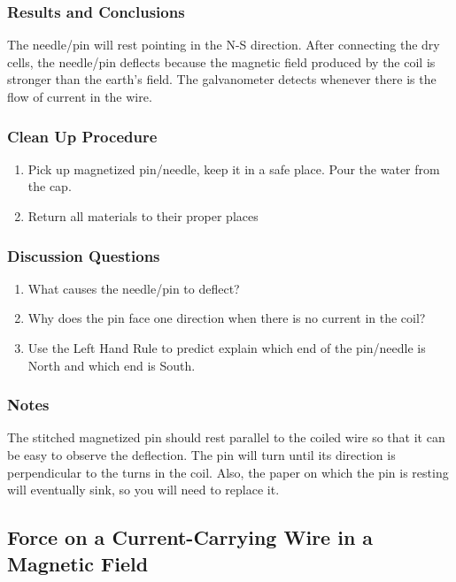 \subsubsection*{Results and Conclusions}
The needle/pin will rest pointing in the N-S direction. After connecting the dry cells, the needle/pin deflects because the magnetic field produced by the coil is stronger than the earth's field. The galvanometer detects whenever there is the flow of current in the wire.  

\subsubsection*{Clean Up Procedure}
\begin{enumerate}
\item{Pick up magnetized pin/needle, keep it in a safe place. Pour the water from the cap.} 
\item{Return all materials to their proper places}
\end{enumerate}

\subsubsection*{Discussion Questions}
\begin{enumerate}
\item{What causes the needle/pin to deflect?}
\item{Why does the pin face one direction when there is no current in the coil?}
\item{Use the Left Hand Rule to predict explain which end of the pin/needle is North and which end is South.} 
\end{enumerate}

\subsubsection*{Notes}
The stitched magnetized pin should rest parallel to the coiled wire so that it can be easy to observe the deflection. The pin will turn until its direction is perpendicular to the turns in the coil. Also, the paper on which the pin is resting will eventually sink, so you will need to replace it.  

	
	
\subsection{Force on a Current-Carrying Wire in a Magnetic Field}

